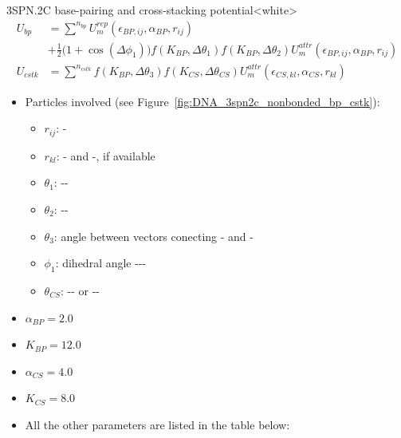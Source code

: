 \begin{smallpage}{3SPN.2C base-pairing and cross-stacking potential}<white>
  \vspace{-1em}
  \begin{align}
    U_{bp} &= \sum^{n_{bp}} U_m^{rep}(\epsilon_{BP, ij}, \alpha_{BP}, r_{ij}) \nonumber \\
           &+ \frac{1}{2} \big( 1+\cos(\Delta \phi_1) \big)
             f(K_{BP}, \Delta\theta_{1})
             f(K_{BP}, \Delta\theta_{2})
             U_m^{attr} (\epsilon_{BP, ij}, \alpha_{BP}, r_{ij})
             \label{eq:dna_3spn2c_nonlocal_base_pairing} \\[.5em]
    U_{cstk} &= \sum^{n_{cstk}} f(K_{BP}, \Delta\theta_{3})
               f(K_{CS}, \Delta\theta_{CS})
               U_m^{attr} (\epsilon_{CS, kl}, \alpha_{CS}, r_{kl})
               \label{eq:dna_3spn2c_nonlocal_cross_stacking}
  \end{align}
  \tcblower
  \begin{itemize}
  \item Particles involved (see Figure~\ref{fig:DNA_3spn2c_nonbonded_bp_cstk}):
    \begin{itemize}
    \item $r_{ij}$: -
    \item $r_{kl}$: - and -, if available
    \item $\theta_{1}$: --
    \item $\theta_{2}$: --
    \item $\theta_{3}$: angle between vectors conecting - and -
    \item $\phi_{1}$: dihedral angle ---
    \item $\theta_{CS}$: -- or --
    \end{itemize}
  \item $\alpha_{BP} = 2.0$
  \item $K_{BP} = 12.0$
  \item $\alpha_{CS} = 4.0$
  \item $K_{CS} = 8.0$
  \item All the other parameters are listed in the table below:
  \end{itemize}
  \begin{center}
    \begin{footnotesize}

\end{footnotesize}
\end{center}
\end{smallpage}
